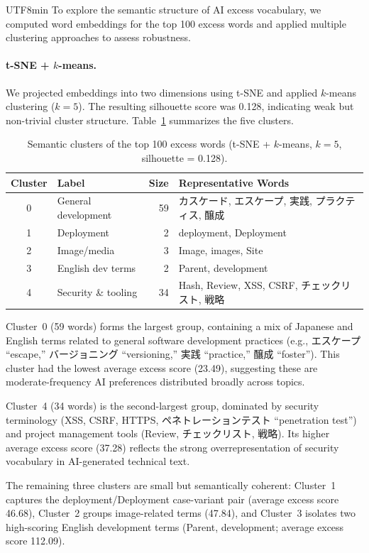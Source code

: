 \documentclass[11pt,a4paper]{article}
\begin{document}
\begin{CJK}{UTF8}{min}
To explore the semantic structure of AI excess vocabulary, we computed word embeddings for the top 100 excess words and applied multiple clustering approaches to assess robustness.

\paragraph{t-SNE + $k$-means.}
We projected embeddings into two dimensions using t-SNE and applied $k$-means clustering ($k = 5$). The resulting silhouette score was 0.128, indicating weak but non-trivial cluster structure. Table~\ref{tab:clusters} summarizes the five clusters.

\begin{table}[H]
\centering
\caption{Semantic clusters of the top 100 excess words (t-SNE + $k$-means, $k = 5$, silhouette = 0.128).}
\label{tab:clusters}
\small
\begin{tabular}{clrl}
\toprule
Cluster & Label & Size & Representative Words \\
\midrule
0 & General development & 59 & カスケード, エスケープ, 実践, プラクティス, 醸成 \\
1 & Deployment & 2 & deployment, Deployment \\
2 & Image/media & 3 & Image, images, Site \\
3 & English dev terms & 2 & Parent, development \\
4 & Security \& tooling & 34 & Hash, Review, XSS, CSRF, チェックリスト, 戦略 \\
\bottomrule
\end{tabular}
\end{table}

Cluster~0 (59 words) forms the largest group, containing a mix of Japanese and English terms related to general software development practices (e.g., エスケープ ``escape,'' バージョニング ``versioning,'' 実践 ``practice,'' 醸成 ``foster''). This cluster had the lowest average excess score (23.49), suggesting these are moderate-frequency AI preferences distributed broadly across topics.

Cluster~4 (34 words) is the second-largest group, dominated by security terminology (XSS, CSRF, HTTPS, ペネトレーションテスト ``penetration test'') and project management tools (Review, チェックリスト, 戦略). Its higher average excess score (37.28) reflects the strong overrepresentation of security vocabulary in AI-generated technical text.

The remaining three clusters are small but semantically coherent: Cluster~1 captures the deployment/Deployment case-variant pair (average excess score 46.68), Cluster~2 groups image-related terms (47.84), and Cluster~3 isolates two high-scoring English development terms (Parent, development; average excess score 112.09).


\end{CJK}
\end{document}
